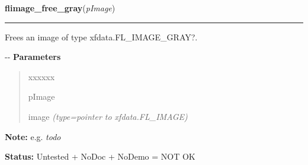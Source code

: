     \label{xformslib:flflimage:flimage_free_gray}

    \vspace{0.5ex}

\hspace{.8\funcindent}\begin{boxedminipage}{\funcwidth}

    \raggedright \textbf{flimage\_free\_gray}(\textit{pImage})

    \vspace{-1.5ex}

    \rule{\textwidth}{0.5\fboxrule}
\setlength{\parskip}{2ex}

Frees an image of type xfdata.FL\_IMAGE\_GRAY?.

-{}-
\setlength{\parskip}{1ex}
      \textbf{Parameters}
      \vspace{-1ex}

      \begin{quote}
        \begin{Ventry}{xxxxxx}

          \item[pImage]


image
            {\it (type=pointer to xfdata.FL\_IMAGE)}

        \end{Ventry}

      \end{quote}

\textbf{Note:} 
e.g. \emph{todo}


\textbf{Status:} 
Untested + NoDoc + NoDemo = NOT OK


    \end{boxedminipage}

    \label{xformslib:flflimage:flimage_free_linearlut}

    \vspace{0.5ex}

